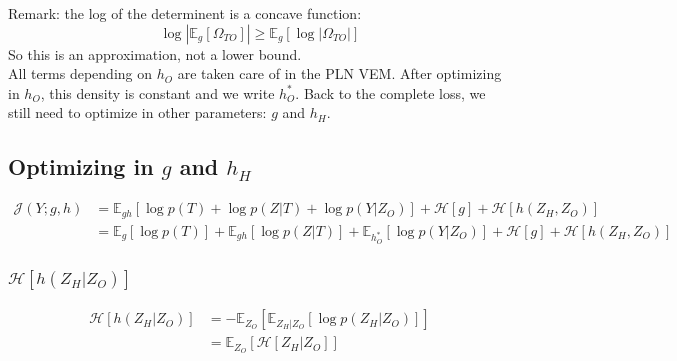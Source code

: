 \documentclass[11pt,a4paper]{article}
\newcommand{\Esp}{\mathds{E}}
\newcommand{\entr}{\mathcal{H}}
\begin{document}
Remark: the log of the determinent is a concave function:
$$\log |\Esp_g[\Omega_{TO}]| \geq \Esp_g [\log |\Omega_{TO}|]$$
So this is an approximation, not a lower bound.\\

All terms depending on $h_O$ are taken care of in the PLN VEM. After optimizing in $h_O$, this density is constant and we write $h_O^*$. Back to the complete loss, we still need to optimize in other parameters: $g$ and $h_H$.

\subsection{Optimizing in $g$ and $h_H$}
\begin{align*}
\mathcal{J}(Y; g,h)&= \Esp_{gh}[\log p(T) + \log p(Z|T) + \log p(Y|Z_O)] + \entr[g ] +\entr[h(Z_H,Z_O)]\\
&= \Esp_g[\log p(T)] + \Esp_{gh}[\log p(Z|T)] + \Esp_{h_O^*}[\log p(Y|Z_O)] + \entr[g ] +\entr[h(Z_H,Z_O)]
\end{align*}




\subsubsection{$ \entr[h(Z_H|Z_O)]$}

\begin{align*}
\entr[h(Z_H|Z_O)] &=   - \Esp_{Z_O}\left[\Esp_{Z_H|Z_O}[\log p(Z_H| Z_O)]\right]\\
&= \Esp_{Z_O}\left[\entr[Z_H|Z_O]\right]
\end{align*}
\end{document}
